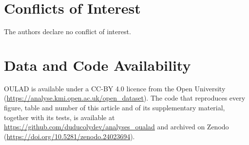 \documentclass[journal]{IEEEtran}
\begin{document}
\section*{Conflicts of Interest}
The authors declare no conflict of interest.

\section*{Data and Code Availability}
OULAD is available under a CC-BY 4.0 licence from the Open University (\url{https://analyse.kmi.open.ac.uk/open_dataset}). The code that reproduces every figure, table and number of this article and of its supplementary material, together with its tests, is available at \url{https://github.com/duducolydev/analyses_oualad} and archived on Zenodo (\url{https://doi.org/10.5281/zenodo.24023694}).



\end{document}
